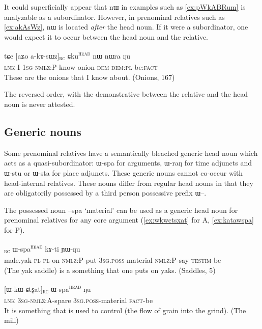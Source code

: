 \documentclass[oldfontcommands,oneside,a4paper,11pt]{article}
\newcommand{\ipa}[1]{{\phon #1}} %
\newcommand{\topic}{\textsc{dem}}
\newcommand{\tete}{\textsuperscript{\textsc{head}}}
\newcommand{\rc}{\textsubscript{\textsc{rc}}}
\begin{document}
It could superficially appear that \ipa{nɯ} in examples such as  \ref{ex:pWkABRum} is analyzable as a subordinator. However, in prenominal relatives such as \ref{ex:akAsWz}, \ipa{nɯ} is located \textit{after} the head noun. If it were a subordinator, one would expect it to occur between the head noun and the relative.

\begin{exe}
   \ex \label{ex:akAsWz}
 \gll
\ipa{tɕe}  	[\ipa{aʑo}  	\ipa{a-kɤ-sɯz}]\rc{}  	\ipa{ɕku}\tete{}  	\ipa{nɯ}  	\ipa{nɯra}  	\ipa{ŋu}  \\
\textsc{lnk} I \textsc{1sg-nmlz:P}-know onion \topic{} \textsc{dem:pl} be:\textsc{fact} \\
\glt These are the onions that I know about.  (Onions, 167)
\end{exe}

The reversed order, with the demonstrative between the relative and the head noun is never attested.

\subsection{Generic nouns} \label{sec:generic.noun}
Some prenominal relatives have a semantically bleached generic head noun which acts as a quasi-subordinator: \ipa{ɯ-spa} for arguments, \ipa{ɯ-raŋ} for time adjuncts and \ipa{ɯ-stu} or \ipa{ɯ-sta} for place adjuncts. These generic nouns cannot co-occur with head-internal relatives. These nouns differ from regular head nouns in that they are obligatorily possessed by a third person possessive prefix \ipa{ɯ}--.


The possessed noun \ipa{--spa} `material' can be used as a generic head noun for prenominal relatives for any core argument (\ref{ex:wkwctsxat} for A, \ref{ex:katawspa} for P).

     \begin{exe}
   \ex \label{ex:katawspa}
 \gll  [\ipa{qambrɯ}   	\ipa{ra}   	\ipa{nɯ-taʁ}   	\ipa{kɤ-ta}]\rc{}   	\ipa{ɯ-spa}\tete{}   	\ipa{kɤ-ti}   	\ipa{ɲɯ-ŋu}   \\
male.yak \textsc{pl} \textsc{pl}-on \textsc{nmlz:P}-put \textsc{3sg.poss}-material \textsc{nmlz:P}-say \textsc{testim}-be \\
\glt (The yak saddle) is a something that one puts on  yaks. (Saddles, 5)
\end{exe}


     \begin{exe}
   \ex \label{ex:wkwctsxat}
 \gll \ipa{tɕe}   	[\ipa{ɯ-kɯ-ɕtʂat}]\rc{}   	\ipa{ɯ-spa}\tete{}   	\ipa{ŋu}        \\
\textsc{lnk} \textsc{3sg-nmlz:A}-spare  \textsc{3sg.poss}-material \textsc{fact}-be\\
\glt  It is something that is used to control (the flow of grain into the grind). (The mill)
\end{exe}
\end{document}
